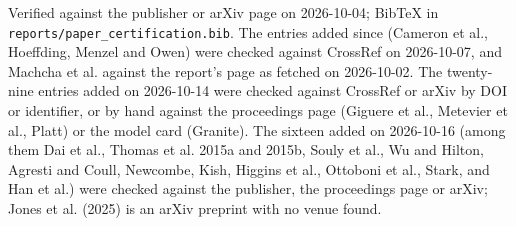 \documentclass[11pt]{article}
\begin{document}
Verified against the publisher or arXiv page on 2026-10-04; BibTeX in \texttt{reports/\allowbreak paper\_\allowbreak certification.bib}. The entries added since (Cameron et al., Hoeffding, Menzel and Owen) were checked against CrossRef on 2026-10-07, and Machcha et al. against the report's page as fetched on 2026-10-02. The twenty-nine entries added on 2026-10-14 were checked against CrossRef or arXiv by DOI or identifier, or by hand against the proceedings page (Giguere et al., Metevier et al., Platt) or the model card (Granite). The sixteen added on 2026-10-16 (among them Dai et al., Thomas et al. 2015a and 2015b, Souly et al., Wu and Hilton, Agresti and Coull, Newcombe, Kish, Higgins et al., Ottoboni et al., Stark, and Han et al.) were checked against the publisher, the proceedings page or arXiv; Jones et al. (2025) is an arXiv preprint with no venue found.
\end{document}

